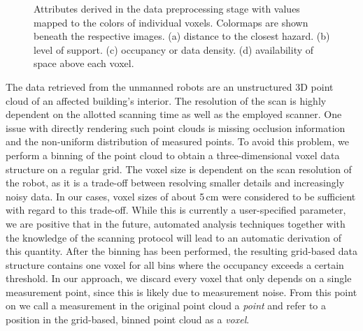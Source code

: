 \documentclass[conference,10pt,letter]{IEEEtran}
\begin{document}
\begin{figure}
{	    \label{fig:overview:precomputation:occupancyfield}
	}
	\hfill
	\caption{Attributes derived in the data preprocessing stage with values mapped to the colors of individual voxels. Colormaps are shown beneath the respective images. (a) distance to the closest hazard. (b) level of support. (c) occupancy or data density. (d) availability of space above each voxel.}
    \label{fig:overview:precomputation}
\end{figure}

 The data retrieved from the unmanned robots are an unstructured 3D point cloud of an affected building's interior. The resolution of the scan is highly dependent on the allotted scanning time as well as the employed scanner. One issue with directly rendering such point clouds is missing occlusion information and the non-uniform distribution of measured points. To avoid this problem, we perform a binning of the point cloud to obtain a three-dimensional voxel data structure on a regular grid. The voxel size is dependent on the scan resolution of the robot, as it is a trade-off between resolving smaller details and increasingly noisy data. In our cases, voxel sizes of about 5\,cm were considered to be sufficient with regard to this trade-off. While this is currently a user-specified parameter, we are positive that in the future, automated analysis techniques together with the knowledge of the scanning protocol will lead to an automatic derivation of this quantity. After the binning has been performed, the resulting grid-based data structure contains one voxel for all bins where the occupancy exceeds a certain threshold. In our approach, we discard every voxel that only depends on a single measurement point, since this is likely due to measurement noise. From this point on we call a measurement in the original point cloud a \emph{point} and refer to a position in the grid-based, binned point cloud as a \emph{voxel}.
\end{document}
